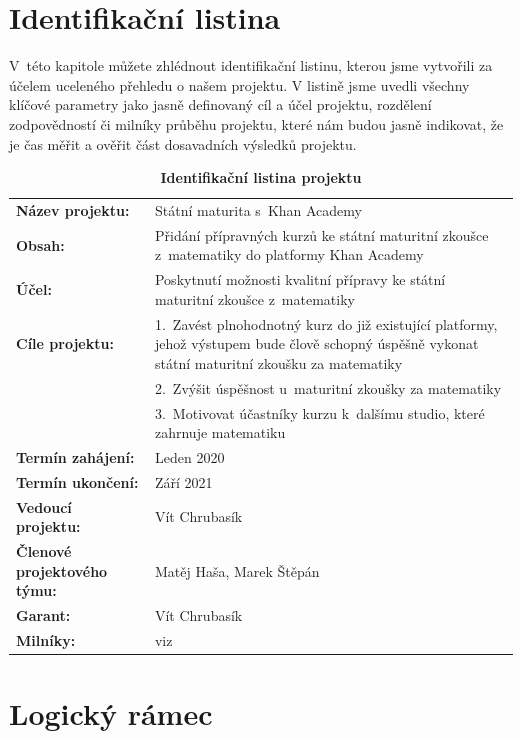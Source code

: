 \documentclass[12pt, a4paper]{report}
\begin{document}
\chapter{Identifikační listina}
\label{sec:orge003a70}
V této kapitole můžete zhlédnout identifikační listinu, kterou jsme vytvořili za
účelem uceleného přehledu o našem projektu. V listině jsme uvedli všechny
klíčové parametry jako jasně definovaný cíl a účel projektu, rozdělení
zodpovědností či milníky průběhu projektu, které nám budou jasně indikovat, že
je čas měřit a ověřit část dosavadních výsledků projektu.

\begin{table}[htbp]
\caption{\textbf{Identifikační listina projektu}}
\centering
\footnotesize
\begin{tabularx}{\textwidth}{lX}
\textbf{Název projektu:} & Státní maturita s Khan Academy\\
\textbf{Obsah:} & Přidání přípravných kurzů ke státní maturitní zkoušce z matematiky do platformy Khan Academy\\
\textbf{Účel:} & Poskytnutí možnosti kvalitní přípravy ke státní maturitní zkoušce z matematiky\\
\textbf{Cíle projektu:} & 1. Zavést plnohodnotný kurz do již existující platformy, jehož výstupem bude člově schopný úspěšně vykonat státní maturitní zkoušku za matematiky\\
 & 2. Zvýšit úspěšnost u maturitní zkoušky za matematiky\\
 & 3. Motivovat účastníky kurzu k dalšímu studio, které zahrnuje matematiku\\
\textbf{Termín zahájení:} & Leden 2020\\
\textbf{Termín ukončení:} & Září 2021\\
\textbf{Vedoucí projektu:} & Vít Chrubasík\\
\textbf{Členové projektového týmu:} & Matěj Haša, Marek Štěpán\\
\textbf{Garant:} & Vít Chrubasík\\
\textbf{Milníky:} & viz \cite{ms_project_soubor}\\
\end{tabularx}
\end{table}


\chapter{Logický rámec}
\label{sec:org4678299}
\end{document}
